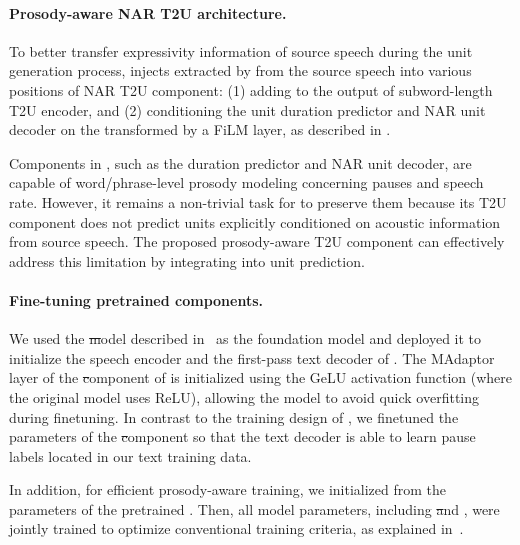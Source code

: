 \paragraph{Prosody-aware NAR T2U architecture.}

To better transfer expressivity information of source speech during the unit generation process, \prosodyunitytwo injects \ptvemb extracted by \ptvenc from the source speech into various positions of NAR T2U component: (1) adding \ptvemb to the output of subword-length T2U encoder, and (2) conditioning the unit duration predictor and NAR unit decoder on the transformed \ptvemb by a FiLM layer, as described in .


Components in \unitytwo, such as the duration predictor and NAR unit decoder, are capable of word/phrase-level prosody modeling concerning pauses and speech rate. However, it remains a non-trivial task for \unitytwo to preserve them because its T2U component does not predict units explicitly conditioned on acoustic information from source speech. 
The proposed prosody-aware T2U component can effectively address this limitation by integrating \ptvemb into unit prediction.

\paragraph{Fine-tuning pretrained components.}
We used the \st model described in~ as the foundation model and deployed it to initialize the speech encoder and the first-pass text decoder of \prosodyunitytwo.
The MAdaptor layer of the \st component of \prosodyunitytwo is initialized using the GeLU activation function (where the original model uses ReLU), allowing the model to avoid quick overfitting during finetuning. In contrast to the training design of , we finetuned the parameters of the \st component so that the text decoder is able to learn pause labels located in our text training data.

In addition, for efficient prosody-aware training, we initialized \ptvenc from the parameters of the pretrained \ptv.
Then, all model parameters, including \st and \ptvenc, were jointly trained to optimize conventional \unitytwo training criteria, as explained in~.



